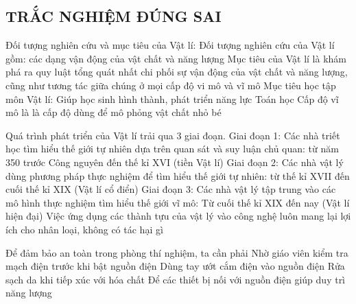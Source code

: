\subsection{TRẮC NGHIỆM ĐÚNG SAI}
\setcounter{ex}{0}
\begin{ex}
	Đối tượng nghiên cứu và mục tiêu của Vật lí:
	\choiceTF
	{\True Đối tượng nghiên cứu của Vật lí gồm: các dạng vận động của vật chất và năng lượng}
	{\True Mục tiêu của Vật lí là khám phá ra quy luật tổng quát nhất chi phối sự vận động của vật chất và năng lượng, cũng như tương tác giữa chúng ở mọi cấp độ vi mô và vĩ mô}
	{Mục tiêu học tập môn Vật lí: Giúp học sinh hình thành, phát triển năng lực Toán học}
	{Cấp độ vĩ mô là là cấp độ dùng để mô phỏng vật chất nhỏ bé}
\end{ex}
\begin{ex}
	Quá trình phát triển của Vật lí trải qua 3 giai đoạn.
	\choiceTF
	{\True Giai đoạn 1: Các nhà triết học tìm hiểu thế giới tự nhiên dựa trên quan sát và suy luận chủ quan: từ năm 350 trước Công nguyên đến thế kỉ XVI (tiền Vật lí)}
	{\True Giai đoạn 2: Các nhà vật lý dùng phương pháp thực nghiệm để tìm hiểu thế giới tự nhiên: từ thế kỉ XVII đến cuối thế kỉ XIX (Vật lí cổ điển)}
	{Giai đoạn 3: Các nhà vật lý tập trung vào các mô hình thực nghiệm tìm hiểu thế giới vĩ mô: Từ cuối thế kỉ XIX đến nay (Vật lí hiện đại)}
	{Việc ứng dụng các thành tựu của vật lý vào công nghệ luôn mang lại lợi ích cho nhân loại, không có tác hại gì}
\end{ex}
\begin{ex}
	Để đảm bảo an toàn trong phòng thí nghiệm, ta cần phải
	\choiceTF
	{\True Nhờ giáo viên kiểm tra mạch điện trước khi bật nguồn điện}
	{Dùng tay ướt cắm điện vào nguồn điện}
	{\True Rửa sạch da khi tiếp xúc với hóa chất}
	{Để các thiết bị nối với nguồn điện giúp duy trì năng lượng}
\end{ex}
